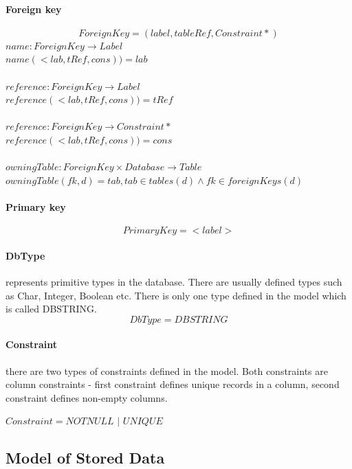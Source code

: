 \documentclass[11pt]{article}
\begin{document}
\paragraph{Foreign key}
$$
ForeignKey = (label, tableRef, Constraint*)
$$
$name : ForeignKey \rightarrow Label $ \\
$name(< lab, tRef, cons)) = lab $ \\ \\
$reference : ForeignKey \rightarrow Label $ \\
$reference(< lab, tRef, cons)) = tRef $ \\ \\
$reference : ForeignKey \rightarrow Constraint* $ \\
$reference(< lab, tRef, cons)) = cons $ \\ \\
$owningTable : ForeignKey \times Database \rightarrow Table $ \\
$owningTable(fk, d) = tab, tab \in tables(d) \wedge fk \in foreignKeys(d) $

\paragraph{Primary key}
$$
PrimaryKey =  < label > 	
$$

\paragraph{DbType} represents primitive types in the database. There are usually defined types such as Char, Integer, Boolean etc. There is only one type defined in the model which is called DBSTRING.
$$
DbType = DBSTRING
$$

\paragraph{Constraint} there are two types of constraints defined in the model. Both constraints are column constraints - first constraint defines unique records in a column, second constraint defines non-empty columns.

\begin{center}
$Constraint = NOTNULL$ $|$ $UNIQUE $
\end{center}

\subsection{Model of Stored Data}
\end{document}
